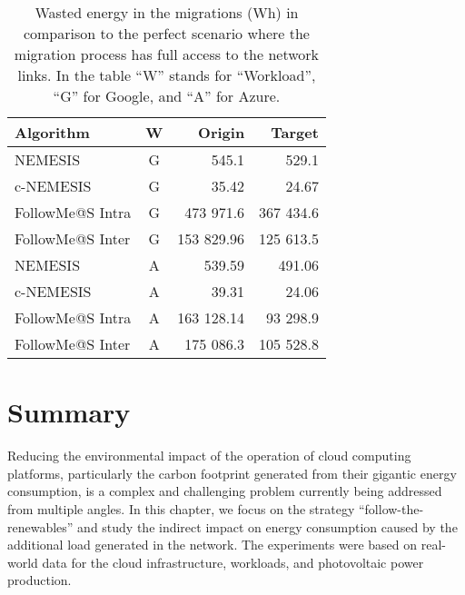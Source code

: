 \begin{table}[!ht]

\caption{Wasted energy in the migrations (Wh) in comparison to the perfect scenario where the migration process has full access to the network links. In the table ``W'' stands for ``Workload'', ``G'' for Google, and ``A'' for Azure.}\label{tab:wasted_mig} \centering
\begin{tabular}{|l|c|r|r|}
  \hline
  \textbf{Algorithm} & \textbf{W}  & \textbf{Origin} & \textbf{Target}   \\
  \hline
  NEMESIS  & G & 545.1  & 529.1 \\
  \hline
  c-NEMESIS & G & 35.42  & 24.67 \\
  \hline
  FollowMe@S Intra & G & 473 971.6 & 367 434.6 \\
  \hline
  FollowMe@S Inter & G & 153 829.96  & 125 613.5  \\
  \hline
  NEMESIS  & A & 539.59  & 491.06 \\
  \hline
  c-NEMESIS & A &  39.31 & 24.06   \\
  \hline
  FollowMe@S Intra & A & 163 128.14  & 93 298.9  \\
  \hline
  FollowMe@S Inter & A & 175 086.3  & 105 528.8 \\
  \hline

\end{tabular}
\end{table}


\section{Summary} \label{sec:conclusion_smargreens}


Reducing the environmental impact of the operation of cloud computing platforms, particularly the carbon footprint generated from their gigantic energy consumption, is a complex and challenging problem currently being addressed from multiple angles. In this chapter, we focus on the strategy ``follow-the-renewables'' and study the indirect impact on energy consumption caused by the additional load generated in the network. The experiments were based on real-world data for the cloud infrastructure, workloads, and photovoltaic power production.

